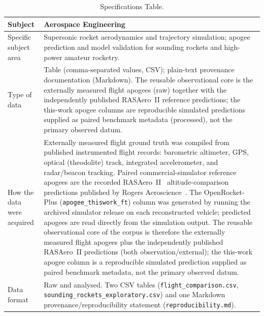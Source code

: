 \begingroup
\renewcommand{\arraystretch}{1.3}
\begin{longtable}{@{}>{\raggedright\arraybackslash}p{}p{}@{}}
\caption{Specifications Table.}
\label{tab:specifications}\\
\toprule
Subject & Aerospace Engineering \\
\midrule
Specific subject area & Supersonic rocket aerodynamics and trajectory simulation; apogee
prediction and model validation for sounding rockets and high-power amateur rocketry. \\
\midrule
Type of data & Table (comma-separated values, CSV); plain-text provenance documentation
(Markdown). The reusable observational core is the externally measured flight apogees
(raw) together with the independently published RASAero~II reference predictions; the
this-work apogee columns are reproducible simulated predictions supplied as paired
benchmark metadata (processed), not the primary observed datum. \\
\midrule
How the data were acquired &
Externally measured flight ground truth was compiled from published instrumented flight
records: barometric altimeter, GPS, optical (theodolite) track, integrated accelerometer,
and radar/beacon tracking. Paired commercial-simulator reference apogees are the recorded
RASAero~II~\cite{rogers2015} altitude-comparison predictions published by Rogers
Aeroscience~\cite{rogers_rasaero_alt}. The OpenRocket-Plus (\texttt{apogee\_thiswork\_ft})
column was generated by running the archived simulator release on each reconstructed
vehicle; predicted apogees are read directly from the simulation output. The reusable
observational core of the corpus is therefore the externally measured flight apogees plus
the independently published RASAero~II predictions (both observation/external); the
this-work apogee column is a reproducible simulated prediction supplied as paired benchmark
metadata, not the primary observed datum. \\
\midrule
Data format &
Raw and analysed.
Two CSV tables (\texttt{flight\_comparison.csv}, \texttt{sounding\_rockets\_exploratory.csv})
and one Markdown provenance/reproducibility statement (\texttt{reproducibility.md}). \\
\midrule

\end{longtable}
